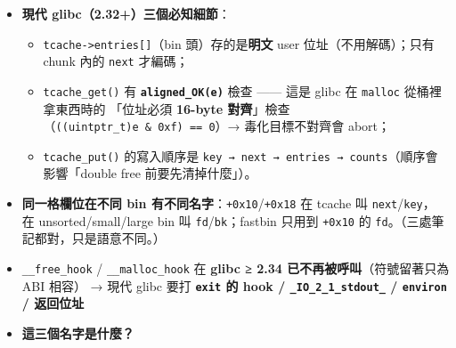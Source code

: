\documentclass[10pt,a4paper]{article}
\providecommand{\tightlist}{%
  \setlength{\itemsep}{0pt}\setlength{\parskip}{0pt}}
\begin{document}
\begin{itemize}
  \begin{itemize}
  \tightlist
  \item
    \textbf{只用得到
    \texttt{user\ \allowbreak{}位址\ \allowbreak{}\textgreater{}\allowbreak{}\textgreater{}\allowbreak{}\ \allowbreak{}12}（高位），不需要完整位址！}
    → 只要洩漏這個 key （最簡單的方法：free 到「空鏈」時
    \texttt{stored\ \allowbreak{}=\ \allowbreak{}key\ \allowbreak{}\^\allowbreak{}{}\allowbreak{}\ \allowbreak{}NULL\ \allowbreak{}=\ \allowbreak{}user\ \allowbreak{}\textgreater{}\allowbreak{}\textgreater{}\allowbreak{}\ \allowbreak{}12}）就能偽造
    \texttt{fd}， 這就是 pwn4 flag「safe-linking 擋不住
    tcache」的意思（見 \texttt{../\allowbreak{}pwn4/\allowbreak{}notes.\allowbreak{}md} §5.4）
  \item
    \textbf{它防的是什麼}：讓「\textbf{拿到 UAF／溢寫、但不知道任何 heap
    位址}」的人無法偽造 \texttt{fd} （不知道 key →
    存進去的解密結果是垃圾位址 → \texttt{malloc} abort），
    也就是讓「盲打 tcache poisoning」和「只改 \texttt{fd} 低 1 byte 的
    partial overwrite」失效。 ⇒ 攻擊前提變成「\textbf{必須先洩漏一次
    heap 位址}」，而那正是 pwn4 做的事。
  \end{itemize}
\item
  \textbf{現代 glibc（2.32+）三個必知細節}：

  \begin{itemize}
  \tightlist
  \item
    \texttt{tcache-\allowbreak{}\textgreater{}\allowbreak{}entries{[}{]}}（bin
    頭）存的是\textbf{明文} user 位址（不用解碼）；只有 chunk 內的
    \texttt{next} 才編碼；
  \item
    \texttt{tcache\_\allowbreak{}get()} 有 \textbf{\texttt{aligned\_\allowbreak{}OK(e)}} 檢查
    ------ 這是 glibc 在 \texttt{malloc} 從桶裡拿東西時的 「位址必須
    \textbf{16-byte
    對齊}」檢查（\texttt{((uintptr\_\allowbreak{}t)e\ \allowbreak{}\&\allowbreak{}\ \allowbreak{}0xf)\ \allowbreak{}==\ \allowbreak{}0}）→
    毒化目標不對齊會 abort；
  \item
    \texttt{tcache\_\allowbreak{}put()} 的寫入順序是
    \texttt{key\ \allowbreak{}→\ \allowbreak{}next\ \allowbreak{}→\ \allowbreak{}entries\ \allowbreak{}→\ \allowbreak{}counts}（順序會影響「double
    free 前要先清掉什麼」）。
  \end{itemize}
\item
  \textbf{同一格欄位在不同 bin
  有不同名字}：\texttt{+0x10}/\texttt{+0x18} 在 tcache 叫
  \texttt{next}/\texttt{key}， 在 unsorted/small/large bin 叫
  \texttt{fd}/\texttt{bk}；fastbin 只用到 \texttt{+0x10} 的
  \texttt{fd}。（三處筆記都對，只是語意不同。）
\item
  \texttt{\_\allowbreak{}\_\allowbreak{}free\_\allowbreak{}hook} / \texttt{\_\allowbreak{}\_\allowbreak{}malloc\_\allowbreak{}hook} 在 \textbf{glibc ≥
  2.34 已不再被呼叫}（符號留著只為 ABI 相容） → 現代 glibc 要打
  \textbf{\texttt{exit} 的 hook / \texttt{\_\allowbreak{}IO\_\allowbreak{}2\_\allowbreak{}1\_\allowbreak{}stdout\_\allowbreak{}} /
  \texttt{environ} / 返回位址}
\item
  \textbf{這三個名字是什麼？}


\end{itemize}
\end{document}
